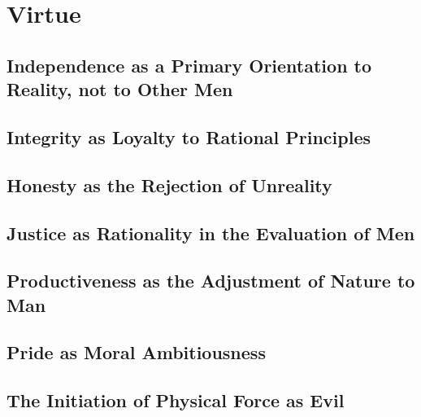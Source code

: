 \chapter{Virtue}

    \section{Independence as a Primary Orientation to Reality, not to Other Men}

    \section{Integrity as Loyalty to Rational Principles}

    \section{Honesty as the Rejection of Unreality}

    \section{Justice as Rationality in the Evaluation of Men}

    \section{Productiveness as the Adjustment of Nature to Man}

    \section{Pride as Moral Ambitiousness}

    \section{The Initiation of Physical Force as Evil}